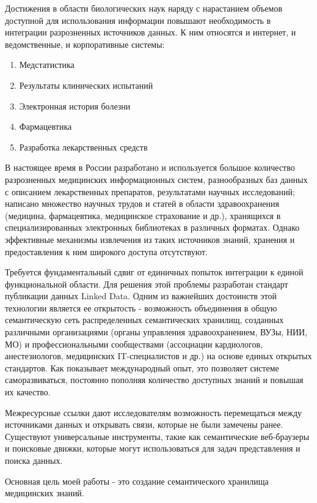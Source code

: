 \documentclass[specialist,subf,href,colorlinks=true
]{disser}
\begin{document}
\tableofcontents %
\intro

Достижения в области биологических наук наряду с нарастанием объемов доступной для использования информации повышают необходимость в интеграции разрозненных источников данных. К ним относятся и интернет, и ведомственные, и корпоративные системы:
\begin{enumerate}
\item Медстатистика
\item Результаты клинических испытаний
\item Электронная история болезни
\item Фармацевтика
\item Разработка лекарственных средств
\end{enumerate}

В настоящее время в России разработано и используется большое количество разрозненных медицинских информационных систем, разнообразных баз данных с описанием лекарственных препаратов, результатами научных исследований; написано множество научных трудов и статей в области здравоохранения (медицина, фармацевтика, медицинское страхование и др.), хранящихся в специализированных электронных библиотеках в различных форматах. Однако эффективные механизмы извлечения из таких источников знаний, хранения и предоставления к ним широкого доступа отсутствуют.

Требуется фундаментальный сдвиг от единичных попыток интеграции к единой функциональной области. Для решения этой проблемы разработан стандарт публикации данных Linked Data. Одним из важнейших достоинств этой технологии является ее открытость - возможность объединения в общую семантическую сеть распределенных семантических хранилищ, созданных различными организациями (органы управления здравоохранением, ВУЗы, НИИ, МО) и профессиональными сообществами (ассоциации кардиологов, анестезиологов, медицинских IT-специалистов и др.) на основе единых открытых стандартов. Как показывает международный опыт, это позволяет системе саморазвиваться, постоянно пополняя количество доступных знаний и повышая их качество.

Межресурсные ссылки дают исследователям возможность перемещаться между источниками данных и открывать связи, которые не были замечены ранее. Существуют универсальные инструменты, такие как семантические веб-браузеры и поисковые движки, которые могут использоваться для задач представления и поиска данных.

Основная цель моей работы - это создание семантического хранилища медицинских знаний.
\end{document}
